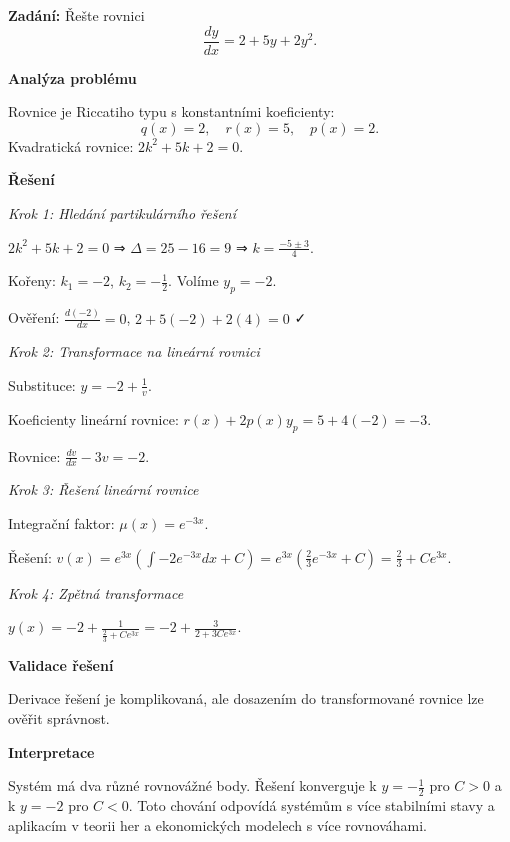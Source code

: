 \begin{example}
\label{ex:a1-stredni-dva-koreny}

\noindent\textbf{Zadání:} Řešte rovnici
\[
\frac{dy}{dx} = 2 + 5y + 2y^2.
\]

\vspace{1.5\baselineskip}

\noindent\textbf{Analýza problému}

\noindent Rovnice je Riccatiho typu s konstantními koeficienty:
\[
q(x) = 2, \quad r(x) = 5, \quad p(x) = 2.
\]
Kvadratická rovnice: $2k^2 + 5k + 2 = 0$.

\vspace{1.5\baselineskip}

\noindent\textbf{Řešení}

\noindent\textit{Krok 1: Hledání partikulárního řešení}

$2k^2 + 5k + 2 = 0$ ⇒ $\Delta = 25 - 16 = 9$ ⇒ $k = \frac{-5 \pm 3}{4}$.

Kořeny: $k_1 = -2$, $k_2 = -\frac{1}{2}$. Volíme $y_p = -2$.

Ověření: $\frac{d(-2)}{dx} = 0$, $2 + 5(-2) + 2(4) = 0$ ✓

\noindent\textit{Krok 2: Transformace na lineární rovnici}

Substituce: $y = -2 + \frac{1}{v}$.

Koeficienty lineární rovnice: $r(x) + 2p(x)y_p = 5 + 4(-2) = -3$.

Rovnice: $\frac{dv}{dx} - 3v = -2$.

\noindent\textit{Krok 3: Řešení lineární rovnice}

Integrační faktor: $\mu(x) = e^{-3x}$.

Řešení: $v(x) = e^{3x}\left(\int -2e^{-3x}dx + C\right) = e^{3x}\left(\frac{2}{3}e^{-3x} + C\right) = \frac{2}{3} + Ce^{3x}$.

\noindent\textit{Krok 4: Zpětná transformace}

$y(x) = -2 + \frac{1}{\frac{2}{3} + Ce^{3x}} = -2 + \frac{3}{2 + 3Ce^{3x}}$.

\vspace{1.5\baselineskip}

\noindent\textbf{Validace řešení}

Derivace řešení je komplikovaná, ale dosazením do transformované rovnice lze ověřit správnost.

\vspace{1.5\baselineskip}

\noindent\textbf{Interpretace}

Systém má dva různé rovnovážné body. Řešení konverguje k $y = -\frac{1}{2}$ pro $C > 0$ 
a k $y = -2$ pro $C < 0$. Toto chování odpovídá systémům s více stabilními stavy 
a aplikacím v teorii her a ekonomických modelech s více rovnováhami.

\end{example}

